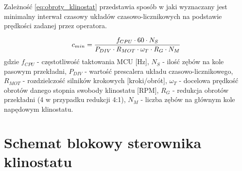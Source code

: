 Zależność \ref{eq:obroty_klinostat} przedstawia sposób w jaki wyznaczany jest minimalny interwał czasowy układów czasowo-licznikowych na podstawie prędkości zadanej przez operatora.

\begin{equation}\label{eq:obroty_klinostat}
	c_{min} = \frac{f_{CPU} \cdot 60 \cdot N_S}{P_{DIV} \cdot R_{MOT} \cdot \omega_T \cdot R_G \cdot N_M}
	\vspace{3mm}
\end{equation}
gdzie $f_{CPU}$ - częstotliwość taktowania MCU  [Hz], $N_S$ - ilość zębów na kole pasowym przekładni, $P_{DIV}$ - wartość prescalera układu czasowo-licznikowego, $R_{MOT}$ - rozdzielczość silników krokowych [kroki/obrót], $\omega_T$ - docelowa prędkość obrotów danego stopnia swobody klinostatu [RPM], $R_G$ - redukcja obrotów przekładni (4 w przypadku redukcji 4:1), $N_M$ - liczba zębów na głównym kole napędowym klinostatu.

\section{Schemat blokowy sterownika klinostatu}

